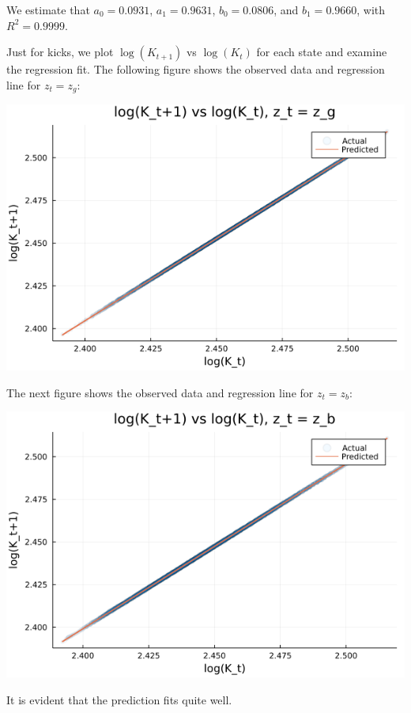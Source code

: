 \documentclass[12pt]{article}
\begin{document}
We estimate that $a_0 = 0.0931$, $a_1 = 0.9631$, $b_0 = 0.0806$, and $b_1 = 0.9660$, with $R^2 = 0.9999$.

Just for kicks, we plot $\log(K_{t+1})$ vs $\log(K_t)$ for each state and examine the regression fit. The following figure shows the observed data and regression line for $z_t = z_g$:
\begin{center}
    \includegraphics[scale=0.4]{gplot.png}
\end{center}
The next figure shows the observed data and regression line for $z_t = z_b$:
\begin{center}
    \includegraphics[scale=0.4]{bplot.png}
\end{center}
It is evident that the prediction fits quite well.
\end{document}
